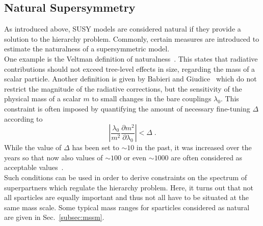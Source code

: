 \subsection{Natural Supersymmetry}
\label{subsec:natural_susy}
As introduced above, SUSY models are considered natural if they provide a solution to the hierarchy problem. Commonly, certain measures are introduced to estimate the naturalness of a supersymmetric model. \\
One example is the Veltman definition of naturalness~\cite{veltman1981infrared}. This states that radiative contributions should not exceed tree-level effects in size, regarding the mass of a scalar particle. Another definition is given by Babieri and Giudice~\cite{Barbieri198863} which do not restrict the magnitude of the radiative corrections, but the sensitivity of the physical mass of a scalar $m$ to small changes in the bare couplings $\lambda_0$. This constraint is often imposed by quantifying the amount of necessary fine-tuning $\Delta$ according to
\begin{equation}
\left| \frac{\lambda_0}{m^2}\frac{\partial m^2}{\partial \lambda_0} \right| < \Delta \; .
\end{equation}
While the value of $\Delta$ has been set to $\sim10$ in the past, it was increased over the years so that now also values of $\sim100$ or even $\sim1000$ are often considered as acceptable values~\cite{Craig:2013cxa}. \\
Such conditions can be used in order to derive constraints on the spectrum of superpartners which regulate the hierarchy problem. Here, it turns out that not all sparticles are equally important and thus not all have to be situated at the same mass scale. Some typical mass ranges for sparticles considered as natural are given in Sec.~\ref{subsec:mssm}. 

